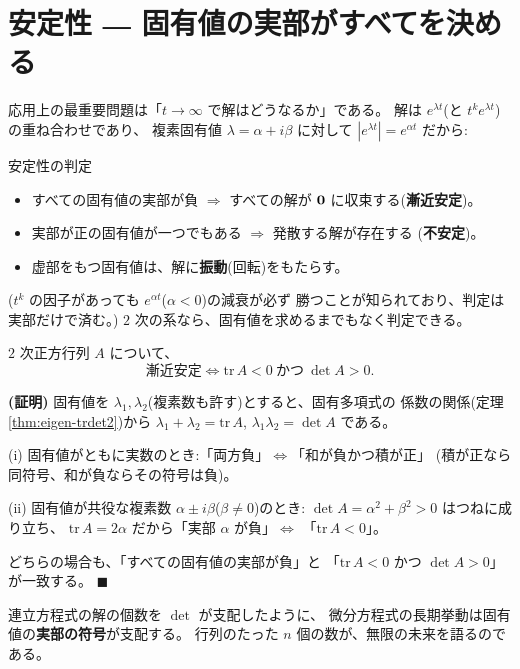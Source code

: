 \section{安定性 ― 固有値の実部がすべてを決める}

応用上の最重要問題は「$t \to \infty$ で解はどうなるか」である。
解は $e^{\lambda t}$(と $t^k e^{\lambda t}$)の重ね合わせであり、
複素固有値 $\lambda = \alpha + i\beta$ に対して
$|e^{\lambda t}| = e^{\alpha t}$ だから:

\begin{itembox}[l]{安定性の判定}
\begin{itemize}
\item すべての固有値の実部が負 $\Rightarrow$ すべての解が
$\bm{0}$ に収束する(\textbf{漸近安定})。
\item 実部が正の固有値が一つでもある $\Rightarrow$ 発散する解が存在する
(\textbf{不安定})。
\item 虚部をもつ固有値は、解に\textbf{振動}(回転)をもたらす。
\end{itemize}
\end{itembox}

($t^k$ の因子があっても $e^{\alpha t}$($\alpha < 0$)の減衰が必ず
勝つことが知られており、判定は実部だけで済む。)
$2$ 次の系なら、固有値を求めるまでもなく判定できる。

\begin{teiri}[$2$ 次の系の安定判定]\label{thm:ode-2x2}
$2$ 次正方行列 $A$ について、
\[
\text{漸近安定}
\iff \mathrm{tr}\,A < 0 \ \text{かつ}\ \det A > 0.
\]
\end{teiri}

\noindent\textbf{(証明)}\quad
固有値を $\lambda_1, \lambda_2$(複素数も許す)とすると、固有多項式の
係数の関係(定理 \ref{thm:eigen-trdet2})から
$\lambda_1 + \lambda_2 = \mathrm{tr}\,A$,
$\lambda_1 \lambda_2 = \det A$ である。

(i) 固有値がともに実数のとき:「両方負」$\iff$「和が負かつ積が正」
(積が正なら同符号、和が負ならその符号は負)。

(ii) 固有値が共役な複素数 $\alpha \pm i\beta$($\beta \neq 0$)のとき:
$\det A = \alpha^2 + \beta^2 > 0$ はつねに成り立ち、
$\mathrm{tr}\,A = 2\alpha$ だから「実部 $\alpha$ が負」$\iff$
「$\mathrm{tr}\,A < 0$」。

どちらの場合も、「すべての固有値の実部が負」と
「$\mathrm{tr}\,A < 0$ かつ $\det A > 0$」が一致する。 $\blacksquare$

連立方程式の解の個数を $\det$ が支配したように、
微分方程式の長期挙動は固有値の\textbf{実部の符号}が支配する。
行列のたった $n$ 個の数が、無限の未来を語るのである。

